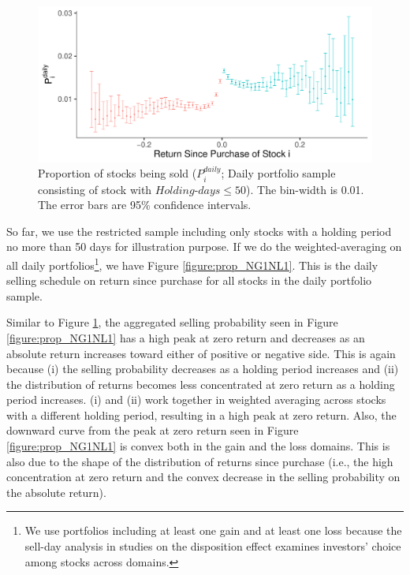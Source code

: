 \documentclass[11pt, a4paper]{article}
\begin{document}
\begin{figure}[H]
	\centering
	\includegraphics[width=0.8\columnwidth]{barc_schedule_daily_less50_NG_NL.pdf}
	\caption{\small Proportion of stocks being sold ($P^{daily}_{i}$; Daily portfolio sample consisting of stock with $Holding\mbox{-}days\leq50$). The bin-width is 0.01. The error bars are 95\% confidence intervals.}
	\label{figure:prop_less50}
\end{figure}


So far, we use the restricted sample including only stocks with a holding period no more than 50 days for illustration purpose.
If we do the weighted-averaging on all daily portfolios\footnote{We use portfolios including at least one gain and at least one loss because the sell-day analysis in studies on the disposition effect examines investors' choice among stocks across domains.}, we have Figure \ref{figure:prop_NG1NL1}. This is the daily selling schedule on return since purchase for all stocks in the daily portfolio sample. 

Similar to Figure \ref{figure:prop_less50}, the aggregated selling probability seen in Figure \ref{figure:prop_NG1NL1} has a high peak at zero return and decreases as an absolute return increases toward either of positive or negative side. This is again because (i) the selling probability decreases as a holding period increases and (ii) the distribution of returns becomes less concentrated at zero return as a holding period increases. (i) and (ii) work together in weighted averaging across stocks with a different holding period, resulting in a high peak at zero return. Also, the downward curve from the peak at zero return seen in Figure \ref{figure:prop_NG1NL1} is convex both in the gain and the loss domains. This is also due to the shape of the distribution of returns since purchase (i.e., the high concentration at zero return and the convex decrease in the selling probability on the absolute return).
\end{document}
